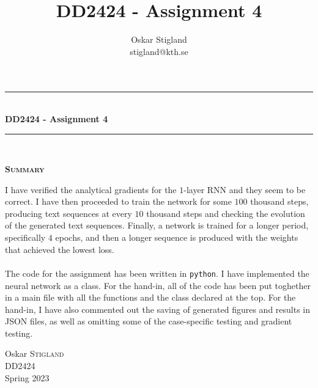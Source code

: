 \documentclass{article}
\title{DD2424 - Assignment 4}
\author{Oskar Stigland \\ stigland@kth.se}
\begin{document}

	\begin{titlepage}
		\begin{center} 
			
			\rule{\linewidth}{0.5mm}\\[0.5 cm]
			{ \huge \bfseries DD2424 - Assignment 4}\\[0.3 cm] %
			\rule{\linewidth}{0.5mm}\\[1 cm]
					
			\small\vfill
			\begin{center}
			\centering
			{\large \bfseries \textsc{Summary}}\\
			\vspace{1cm}
			\begin{minipage}{10cm}
				
				I have verified the analytical gradients for the $1$-layer RNN and they seem to be correct. I have then proceeded to train the network for some $100$ thousand steps, producing text sequences at every $10$ thousand steps and checking the evolution of the generated text sequences. Finally, a network is trained for a longer period, specifically $4$ epochs, and then a longer sequence is produced with the weights that achieved the lowest loss.\\\\
%
	The code for the assignment has been written in \texttt{python}. I have implemented the neural network as a class. For the hand-in, all of the code has been put toghether in a main file with all the functions and the class declared at the top. For the hand-in, I have also commented out the saving of generated figures and results in JSON files, as well as omitting some of the case-specific testing and gradient testing.
			\end{minipage}
			\end{center}
			\large\vfill
						

		\end{center}	
		
		\begin{minipage}{0.4\textwidth}
			\begin{flushleft} \large
				Oskar \textsc{Stigland}\\
				DD2424\\
				Spring 2023
			\end{flushleft}
		\end{minipage}	

	\end{titlepage}
\end{document}
